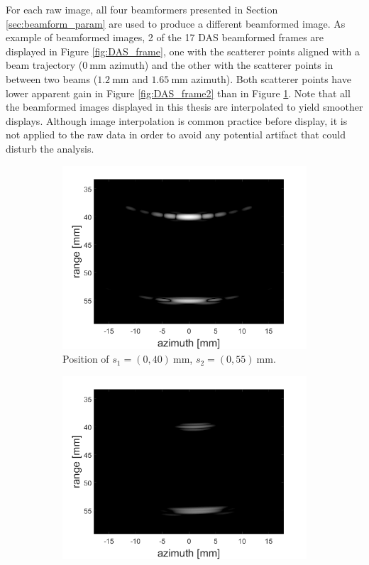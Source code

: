 For each raw image, all four beamformers presented in Section \ref{sec:beamform_param} are used to produce a different beamformed image. As example of beamformed images, 2 of the 17 DAS beamformed frames are displayed in Figure \ref{fig:DAS_frame}, one with the scatterer points aligned with a beam trajectory ($0~$mm azimuth) and the other with the scatterer points in between two beams ($1.2~$mm and $1.65~$mm azimuth). Both scatterer points have lower apparent gain in Figure \ref{fig:DAS_frame2} than in Figure \ref{fig:DAS_frame1}.
Note that all the beamformed images displayed in this thesis are interpolated to yield smoother displays.
Although image interpolation is common practice before display, it is not applied to the raw data in order to avoid any potential artifact that could disturb the analysis.

\begin{figure}[ht]
    \centering
    \begin{subfigure}[t]{0.48\linewidth}
        \includegraphics[width=\linewidth]{./images/results/1/DAS_frame1.png}
        \caption{Position of $s_1 = (0, 40)~$mm, $s_2 = (0, 55)~$mm.}
        \label{fig:DAS_frame1}
    \end{subfigure}
    \quad
    \begin{subfigure}[t]{0.48\linewidth}
        \includegraphics[width=\linewidth]{./images/results/1/DAS_frame2.png}

\end{subfigure}
\end{figure}
